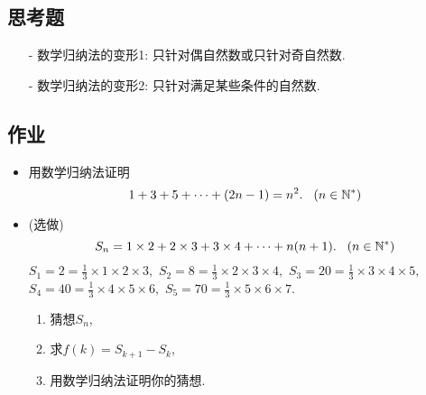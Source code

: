 \documentclass{article}
\begin{document}
\begin{CJK}{UTF8}{gkai}
\subsection{思考题}
\begin{itemize}
\item[-] 数学归纳法的变形1: 只针对偶自然数或只针对奇自然数.
\item[-] 数学归纳法的变形2: 只针对满足某些条件的自然数.
\end{itemize}

\subsection{作业}
\begin{itemize}
\item 用数学归纳法证明
$$1 + 3 + 5 + \cdots + (2n-1) = n^2.\hspace{3mm}(n \in \mathbb{N}^*)$$
\item (选做)$$S_n = 1 \times 2 + 2 \times 3 + 3 \times 4 + \cdots + n(n+1). \hspace{3mm}(n \in \mathbb{N}^*)$$
$S_1 =  2 = \frac{1}{3} \times 1 \times 2 \times 3,$ \hspace{6mm} $S_2 =  8 = \frac{1}{3} \times 2 \times 3 \times 4,$  \hspace{6mm} $S_3 =  20 = \frac{1}{3} \times 3 \times 4 \times 5,$\\
$S_4 =  40 = \frac{1}{3} \times 4 \times 5 \times 6,$ \hspace{6mm}$S_5 =  70 = \frac{1}{3} \times 5 \times 6 \times 7.$
\begin{enumerate}
\item 猜想$S_n$,
\item 求$f(k) = S_{k+1} - S_k$,
\item 用数学归纳法证明你的猜想.
\end{enumerate}
\end{itemize}

\end{CJK}
\end{document}
